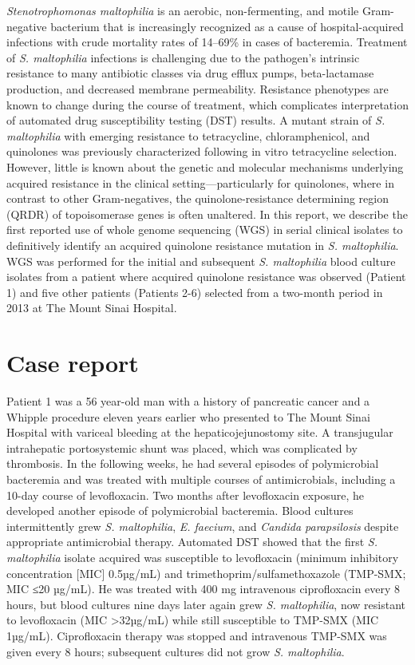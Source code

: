 \emph{Stenotrophomonas maltophilia} is an aerobic, non-fermenting, and motile Gram-negative bacterium that is increasingly recognized as a cause of hospital-acquired infections with crude mortality rates of 14–69\% in cases of bacteremia.\autocite{Brooke2012} Treatment of \emph{S. maltophilia} infections is challenging due to the pathogen’s intrinsic resistance to many antibiotic classes via drug efflux pumps, beta-lactamase production, and decreased membrane permeability.\autocite{Brooke2012} Resistance phenotypes are known to change during the course of treatment, which complicates interpretation of automated drug susceptibility testing (DST) results.\autocite{Garrison1996} A mutant strain of \emph{S. maltophilia} with emerging resistance to tetracycline, chloramphenicol, and quinolones was previously characterized following in vitro tetracycline selection.\autocite{Alonso1997,Sanchez2002} However, little is known about the genetic and molecular mechanisms underlying acquired resistance in the clinical setting—particularly for quinolones, where in contrast to other Gram-negatives, the quinolone-resistance determining region (QRDR) of topoisomerase genes is often unaltered.\autocite{Valdezate2005} In this report, we describe the first reported use of whole genome sequencing (WGS) in serial clinical isolates to definitively identify an acquired quinolone resistance mutation in \emph{S. maltophilia}. WGS was performed for the initial and subsequent \emph{S. maltophilia} blood culture isolates from a patient where acquired quinolone resistance was observed (Patient 1) and five other patients (Patients 2-6) selected from a two-month period in 2013 at The Mount Sinai Hospital. 

\section{Case report}

Patient 1 was a 56 year-old man with a history of pancreatic cancer and a Whipple procedure eleven years earlier who presented to The Mount Sinai Hospital with variceal bleeding at the hepaticojejunostomy site. A transjugular intrahepatic portosystemic shunt was placed, which was complicated by thrombosis. In the following weeks, he had several episodes of polymicrobial bacteremia and was treated with multiple courses of antimicrobials, including a 10-day course of levofloxacin. Two months after levofloxacin exposure, he developed another episode of polymicrobial bacteremia. Blood cultures intermittently grew \emph{S. maltophilia}, \emph{E. faecium}, and \emph{Candida parapsilosis} despite appropriate antimicrobial therapy. Automated DST showed that the first \emph{S. maltophilia} isolate acquired was susceptible to levofloxacin (minimum inhibitory concentration [MIC] 0.5µg/mL) and trimethoprim/sulfamethoxazole (TMP-SMX; MIC ≤20 µg/mL). He was treated with 400 mg intravenous ciprofloxacin every 8 hours, but blood cultures nine days later again grew \emph{S. maltophilia}, now resistant to levofloxacin (MIC >32µg/mL) while still susceptible to TMP-SMX (MIC 1µg/mL). Ciprofloxacin therapy was stopped and intravenous TMP-SMX was given every 8 hours; subsequent cultures did not grow \emph{S. maltophilia}.

